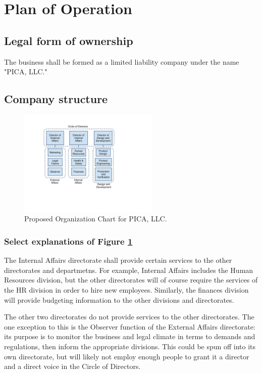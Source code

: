 \section{Plan of Operation}


\subsection{Legal form of ownership}
The business shall be formed as a limited liability company under the name "PICA, LLC."

\subsection{Company structure}

\begin{figure}[htbp]
 \begin{center}
  \includegraphics[trim=1.5in 1.75in 3in 0.75in,clip,width=0.6\textwidth]{figures/PICA_LLC_Org_Chart}
 \end{center}
 \caption{Proposed Organization Chart for PICA, LLC.}
 \label{fig:org-chart}
\end{figure}

\subsubsection{Select explanations of Figure \ref{fig:org-chart} }
The Internal Affairs directorate shall provide certain services to the other directorates and departmetns. For example, Internal Affairs includes the Human Resources division, but the other directorates will of course require the services of the HR division in order to hire new employees. Similarly, the finances division will provide budgeting information to the other divisions and directorates.

The other two directorates do not provide services to the other directorates. The one exception to this is the Observer function of the External Affairs directorate: its purpose is to monitor the business and legal climate in terms to demands and regulations, then inform the appropriate divisions. This could be spun off into its own directorate, but will likely not employ enough people to grant it a director and a direct voice in the Circle of Directors.

